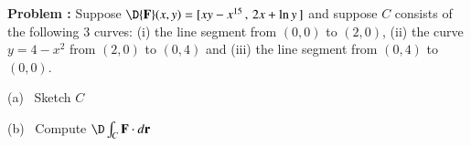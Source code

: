 {\bf Problem :} Suppose $\D {\bf F}(x,y) = [ xy - x^{15} \, , \, 2x + \ln y \,]$ and suppose $C$ consists of the following 3 curves: (i) the line segment from $(0,0)$ to $(2,0)$, (ii) the curve $y=4-x^2$ from $(2,0)$ to $(0,4)$ and (iii) the line segment from $(0,4)$ to $(0,0)$. 

\vspace{0.2cm}

(a) \, Sketch $C$

\vspace{0.2cm}

(b) \, Compute $\D \int_C {\bf F} \cdot d{\bf r} $